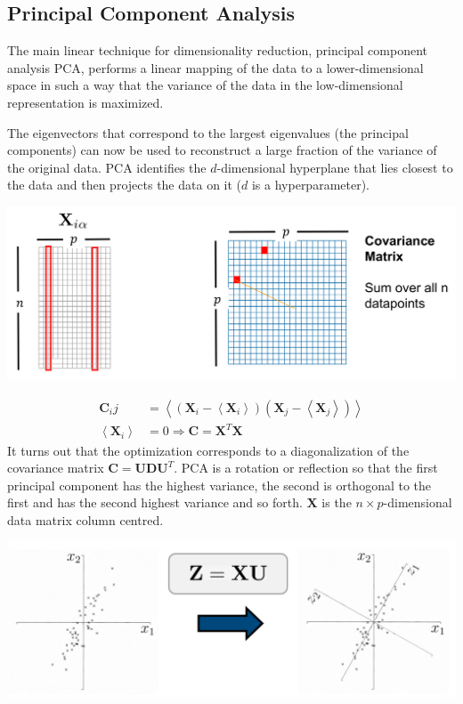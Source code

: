 \documentclass[11pt]{article}
\theoremstyle{definition}
\begin{document}
\subsection{Principal Component Analysis}
The main linear technique for dimensionality reduction, principal component analysis PCA, performs a linear mapping of the data to a lower-dimensional space in such a way that the variance of the data in the low-dimensional representation is maximized.

The eigenvectors that correspond to the largest eigenvalues (the principal components) can now be used to reconstruct a large fraction of the variance of the original data. PCA identifies the $d$-dimensional hyperplane that lies closest to the data and then projects the data on it ($d$ is a hyperparameter).

\begin{center}
	\includegraphics[width=0.7\linewidth]{img/input_covariance_matrix}
\end{center}

\begin{align*}
	\textbf{C}_ij &= \left\langle (\textbf{X}_i - \left\langle \textbf{X}_i \right\rangle) (\textbf{X}_j - \left\langle \textbf{X}_j \right\rangle) \right\rangle\\
	\left\langle \textbf{X}_i \right\rangle &= 0 \Rightarrow \textbf{C} = \textbf{X}^T \textbf{X}
\end{align*}
It turns out that the optimization corresponds to a diagonalization of the covariance matrix $  \textbf{C} = \textbf{U}\textbf{D}\textbf{U}^T$. PCA is a rotation or reflection so that the first principal component has the highest variance, the second is orthogonal to the first and has the second highest variance and so forth. $\textbf{X}$ is the $n\times p$-dimensional data matrix column centred.
\begin{center}
	\includegraphics[width=0.7\linewidth]{img/PCA_X}
\end{center}
\end{document}
